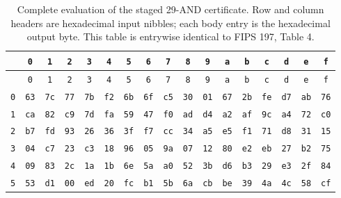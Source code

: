 \begingroup\scriptsize
\setlength{\tabcolsep}{2.7pt}
\begin{longtable}{c*{16}{c}}
\caption{Complete evaluation of the staged 29-AND certificate. Row and column headers are hexadecimal input nibbles; each body entry is the hexadecimal output byte. This table is entrywise identical to FIPS 197, Table 4.}\label{tab:evaluation}\\
\toprule
 & \texttt{0} & \texttt{1} & \texttt{2} & \texttt{3} & \texttt{4} & \texttt{5} & \texttt{6} & \texttt{7} & \texttt{8} & \texttt{9} & \texttt{a} & \texttt{b} & \texttt{c} & \texttt{d} & \texttt{e} & \texttt{f} \\
\midrule
\endfirsthead
\toprule
 & \texttt{0} & \texttt{1} & \texttt{2} & \texttt{3} & \texttt{4} & \texttt{5} & \texttt{6} & \texttt{7} & \texttt{8} & \texttt{9} & \texttt{a} & \texttt{b} & \texttt{c} & \texttt{d} & \texttt{e} & \texttt{f} \\
\midrule
\endhead
\bottomrule
\endfoot
\texttt{0} & \texttt{63} & \texttt{7c} & \texttt{77} & \texttt{7b} & \texttt{f2} & \texttt{6b} & \texttt{6f} & \texttt{c5} & \texttt{30} & \texttt{01} & \texttt{67} & \texttt{2b} & \texttt{fe} & \texttt{d7} & \texttt{ab} & \texttt{76} \\
\texttt{1} & \texttt{ca} & \texttt{82} & \texttt{c9} & \texttt{7d} & \texttt{fa} & \texttt{59} & \texttt{47} & \texttt{f0} & \texttt{ad} & \texttt{d4} & \texttt{a2} & \texttt{af} & \texttt{9c} & \texttt{a4} & \texttt{72} & \texttt{c0} \\
\texttt{2} & \texttt{b7} & \texttt{fd} & \texttt{93} & \texttt{26} & \texttt{36} & \texttt{3f} & \texttt{f7} & \texttt{cc} & \texttt{34} & \texttt{a5} & \texttt{e5} & \texttt{f1} & \texttt{71} & \texttt{d8} & \texttt{31} & \texttt{15} \\
\texttt{3} & \texttt{04} & \texttt{c7} & \texttt{23} & \texttt{c3} & \texttt{18} & \texttt{96} & \texttt{05} & \texttt{9a} & \texttt{07} & \texttt{12} & \texttt{80} & \texttt{e2} & \texttt{eb} & \texttt{27} & \texttt{b2} & \texttt{75} \\
\texttt{4} & \texttt{09} & \texttt{83} & \texttt{2c} & \texttt{1a} & \texttt{1b} & \texttt{6e} & \texttt{5a} & \texttt{a0} & \texttt{52} & \texttt{3b} & \texttt{d6} & \texttt{b3} & \texttt{29} & \texttt{e3} & \texttt{2f} & \texttt{84} \\
\texttt{5} & \texttt{53} & \texttt{d1} & \texttt{00} & \texttt{ed} & \texttt{20} & \texttt{fc} & \texttt{b1} & \texttt{5b} & \texttt{6a} & \texttt{cb} & \texttt{be} & \texttt{39} & \texttt{4a} & \texttt{4c} & \texttt{58} & \texttt{cf} \\

\end{longtable}
